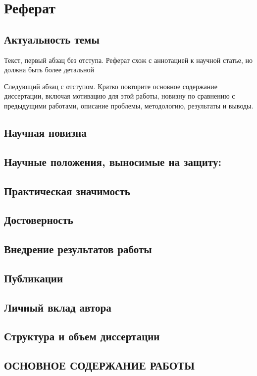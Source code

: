 \chapter*{Реферат}
\section*{Актуальность темы}
\noindent Текст, первый абзац без отступа. Реферат схож с аннотацией к научной статье, но должна быть более детальной

Следующий абзац с отступом. Кратко повторите основное содержание диссертации, включая мотивацию для этой работы, новизну по сравнению с предыдущими работами, описание проблемы, методологию, результаты и выводы.
\section*{Научная новизна}
\section*{Научные положения, выносимые на защиту:}
\section*{Практическая значимость}
\section*{Достоверность}
\section*{Внедрение результатов работы}
\section*{Публикации}
\section*{Личный вклад автора}
\section*{Структура и объем диссертации}
\section*{ОСНОВНОЕ СОДЕРЖАНИЕ РАБОТЫ}